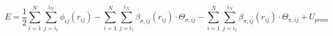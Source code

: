 \documentclass[12pt]{article}
\begin{document}
$$
  E = \frac{1}{2} \sum_{i=1}^{N} \sum_{j=i_1}^{i_N} \phi_{ij} \left( r_{ij} \right) - \sum_{i=1}^{N} \sum_{j=i_1}^{i_N} \beta_{\sigma,ij} \left( r_{ij} \right) \cdot \Theta_{\sigma,ij} - \sum_{i=1}^{N} \sum_{j=i_1}^{i_N} \beta_{\pi,ij} \left( r_{ij} \right) \cdot \Theta_{\pi,ij} + U_{prom}
$$
\end{document}
